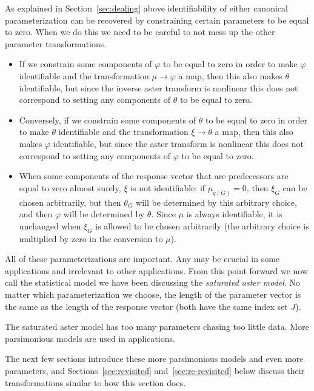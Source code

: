 As explained in Section~\ref{sec:dealing} above identifiability of either
canonical parameterization can be recovered by constraining certain parameters
to be equal to zero.  When we do this we need to be careful to not mess up
the other parameter transformations.
\begin{itemize}
\item If we constrain some components of $\varphi$ to be equal to zero in
    order to make $\varphi$ identifiable and the transformation
    $\mu \to \varphi$ a map, then this also makes $\theta$ identifiable,
    but since the inverse aster transform is nonlinear this does not
    correspond to setting any components of $\theta$ to be equal to zero.
\item Conversely, if we constrain some components of $\theta$ to be equal
    to zero in order to make $\theta$ identifiable and the transformation
    $\xi \to \theta$ a map, then this also makes $\varphi$ identifiable,
    but since the aster transform is nonlinear this does not
    correspond to setting any components of $\varphi$ to be equal to zero.
\item When some components of the response vector that are predecessors
    are equal to zero almost surely, $\xi$ is not identifiable:
    if $\mu_{q(G)} = 0$, then $\xi_G$ can be chosen arbitrarily,
    but then $\theta_G$ will be determined by this arbitrary choice,
    and then $\varphi$ will be determined by $\theta$.
    Since $\mu$ is always identifiable, it is unchanged when $\xi_G$
    is allowed to be chosen arbitrarily (the arbitrary choice is multiplied
    by zero in the conversion to $\mu$).
\end{itemize}

All of these parameterizations are important.  Any may be crucial in
some applications and irrelevant to other applications.  From this point
forward we now call the statistical model we have been discussing the
\emph{saturated aster model}.  No matter which parameterization we choose,
the length of the parameter vector is the same as the length of the response
vector (both have the same index set $J$).

The saturated aster model has too many parameters chasing too little data.
More parsimonious models are used in applications.

The next few sections introduce these more parsimonious models and
even more parameters,
and Sections~\ref{sec:revisited} and~\ref{sec:re-revisited} below
discuss their transformations similar to how this section does.

